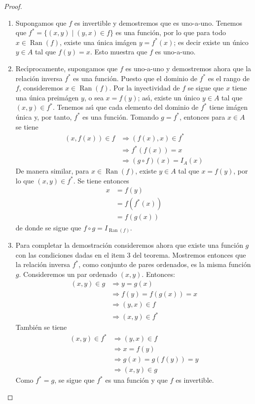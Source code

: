 \begin{proof}
\hfill

\begin{enumerate}
\item Supongamos que $f$ es invertible y demostremos que es uno-a-uno.
Te\-nemos que $f^{\ast}=\{(x,y)\mid(y,x)\in f\}$ es una funci\'{o}n, por lo
que para todo $x\in\operatorname*{Ran}(f)$, existe una \'{u}nica im\'{a}gen
$y=f^{\ast}(x)$; es decir existe un \'{u}nico $y\in A$ tal que $f(y)=x$. Esto
muestra que $f$ es uno-a-uno.

\item Rec\'{\i}procamente, supongamos que $f$ es uno-a-uno y demostremos ahora
que la relaci\'{o}n inversa $f^{\ast}$ es una funci\'{o}n. Puesto que el
dominio de $f^{\ast}$ es el rango de $f$, consideremos $x\in
\operatorname*{Ran}(f)$. Por la inyectividad de $f$ se sigue que $x$ tiene una
\'{u}nica preim\'{a}gen $y$, o sea $x=f(y)$; as\'{\i}, existe un \'{u}nico
$y\in A$ tal que $(x,y)\in f^{\ast}$. Tenemos as\'{\i} que cada elemento del
dominio de $f^{\ast}$ tiene im\'{a}gen \'{u}nica y, por tanto, $f^{\ast}$ es
una funci\'{o}n. Tomando $g=f^{\ast}$, entonces para $x\in A$ se tiene
\begin{align*}
(x,f(x))\in f  &  \Longrightarrow(f(x),x)\in f^{\ast}\\
&  \Longrightarrow f^{\ast}(f(x))=x\\
&  \Longrightarrow(g\circ f)(x)=I_{A}(x)
\end{align*}
De manera similar, para $x\in\operatorname*{Ran}(f)$, existe $y\in A$ tal que
$x=f(y)$, por lo que $(x,y)\in f^{\ast}$. Se tiene entonces
\begin{align*}
x  &  =f(y)\\
&  =f(f^{\ast}(x))\\
&  =f(g(x))
\end{align*}
de donde se sigue que $f\circ g=I_{\operatorname*{Ran}(f)}$.

\item Para completar la demostraci\'{o}n consideremos ahora que existe una
funci\'{o}n $g$ con las condiciones dadas en el item $3$ del teorema.
Mostremos entonces que la relaci\'{o}n inversa $f^{\ast}$, como conjunto de
pares ordenados, es la misma funci\'{o}n $g$. Consideremos un par ordenado
$(x,y)$. Entonces:
\begin{align*}
(x,y)\in g  &  \Longrightarrow y=g(x)\\
&  \Longrightarrow f(y)=f(g(x))=x\\
&  \Longrightarrow(y,x)\in f\\
&  \Longrightarrow(x,y)\in f^{\ast}%
\end{align*}
Tambi\'{e}n se tiene
\begin{align*}
(x,y)\in f^{\ast}  &  \Longrightarrow(y,x)\in f\\
&  \Longrightarrow x=f(y)\\
&  \Longrightarrow g(x)=g(f(y))=y\\
&  \Longrightarrow(x,y)\in g
\end{align*}
Como $f^{\ast}=g$, se sigue que $f^{\ast}$ es una funci\'{o}n y que $f$ es invertible.
\end{enumerate}
\end{proof}

